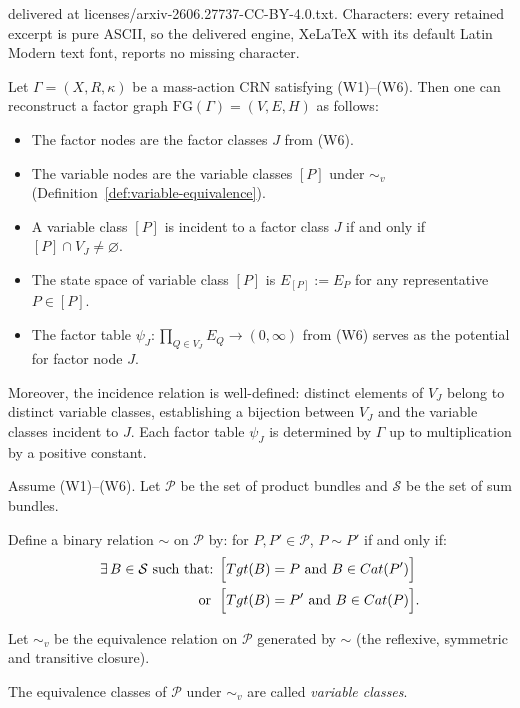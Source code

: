 \documentclass[10pt,a4paper]{amsart}
\newcommand{\Cat}{\textrm{Cat}}
\newcommand{\tgt}{\textrm{Tgt}}
\begin{document}
delivered at licenses/arxiv-2606.27737-CC-BY-4.0.txt. Characters: every retained excerpt is pure ASCII, so the delivered engine, XeLaTeX with its default Latin Modern text font, reports no missing character.
\begin{theorem}\label{thm:recon}
Let $\Gamma = (X, R, \kappa)$ be a mass-action CRN satisfying \textup{(W1)--(W6)}.
Then one can reconstruct a factor graph $\mathrm{FG}(\Gamma) = (V,E, H)$ as follows:
\begin{itemize}
    \item The factor nodes are the factor classes $J$ from \textup{(W6)}.
    \item The variable nodes are the variable classes $[P]$ under $\sim_v$ 
          \textup{(Definition~\ref{def:variable-equivalence})}.
    \item A variable class $[P]$ is incident to a factor class $J$ if and only 
          if $[P] \cap V_J \neq \varnothing$.
    \item The state space of variable class $[P]$ is $E_{[P]} := E_P$ for any 
          representative $P \in [P]$.
    \item The factor table $\psi_J : \prod_{Q \in V_J} E_Q \to (0,\infty)$ from 
          \textup{(W6)} serves as the potential for factor node $J$.
\end{itemize}
Moreover, the incidence relation is well-defined: distinct elements of $V_J$ 
belong to distinct variable classes, establishing a bijection between $V_J$ and 
the variable classes incident to $J$. Each factor table $\psi_J$ is determined 
by $\Gamma$ up to multiplication by a positive constant.
\end{theorem}

\begin{definition}\label{def:variable-equivalence}
Assume (W1)--(W6). Let $\mathcal{P}$ be the set of product bundles and 
$\mathcal{S}$ be the set of sum bundles.

Define a binary relation $\sim$ on $\mathcal{P}$ by: for $P, P' \in \mathcal{P}$,
\newline $P \sim P'$ if and only if:
\begin{align*}
    \exists\, B \in \mathcal{S} \text{ such that: } &
    \Bigl[\tgt(B) = P \text{ and } B \in \Cat(P')\Bigr]
     \\ \;\text{ or }\; &
    \Bigl[\tgt(B) = P' \text{ and } B \in \Cat(P)\Bigr].
\end{align*}

Let $\sim_v$ be the equivalence relation on $\mathcal{P}$ generated by $\sim$
(the reflexive, symmetric and transitive closure).

The equivalence classes of $\mathcal{P}$ under $\sim_v$ are called 
\emph{variable classes}.
\end{definition}
\end{document}
